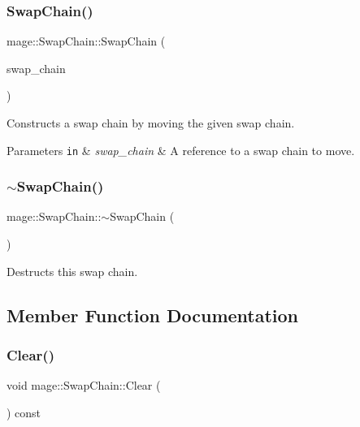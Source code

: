 \subsubsection{\texorpdfstring{Swap\+Chain()}{SwapChain()}\hspace{0.1cm}{\footnotesize\ttfamily [3/3]}}
{\footnotesize\ttfamily mage\+::\+Swap\+Chain\+::\+Swap\+Chain (\begin{DoxyParamCaption}\item[{\hyperlink{classmage_1_1_swap_chain}{Swap\+Chain} \&\&}]{swap\+\_\+chain }\end{DoxyParamCaption})\hspace{0.3cm}{\ttfamily [default]}}

Constructs a swap chain by moving the given swap chain.


\begin{DoxyParams}[1]{Parameters}
\mbox{\tt in}  & {\em swap\+\_\+chain} & A reference to a swap chain to move. \\
\hline
\end{DoxyParams}
\hypertarget{classmage_1_1_swap_chain_a853168cba69cadc3d8c10ad2f4939e72}{}\label{classmage_1_1_swap_chain_a853168cba69cadc3d8c10ad2f4939e72} 
\subsubsection{\texorpdfstring{$\sim$\+Swap\+Chain()}{~SwapChain()}}
{\footnotesize\ttfamily mage\+::\+Swap\+Chain\+::$\sim$\+Swap\+Chain (\begin{DoxyParamCaption}{ }\end{DoxyParamCaption})}

Destructs this swap chain. 

\subsection{Member Function Documentation}
\hypertarget{classmage_1_1_swap_chain_a94b28938ba9e402665197a71409ae43a}{}\label{classmage_1_1_swap_chain_a94b28938ba9e402665197a71409ae43a} 
\subsubsection{\texorpdfstring{Clear()}{Clear()}}
{\footnotesize\ttfamily void mage\+::\+Swap\+Chain\+::\+Clear (\begin{DoxyParamCaption}{ }\end{DoxyParamCaption}) const\hspace{0.3cm}{\ttfamily [noexcept]}}

